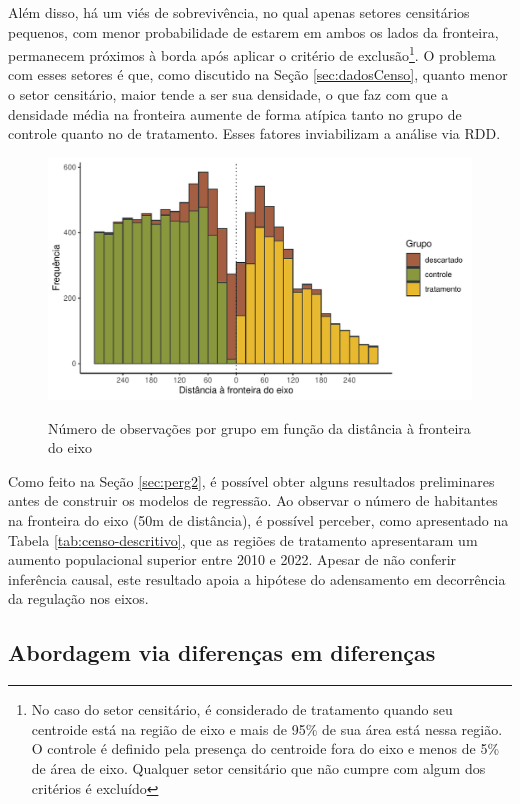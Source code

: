 Além disso, há um viés de sobrevivência, no qual apenas setores censitários pequenos, com menor probabilidade de estarem em ambos os lados da fronteira, permanecem próximos à borda após aplicar o critério de exclusão\footnote{No caso do setor censitário, é considerado de tratamento quando seu centroide está na região de eixo e mais de 95\% de sua área está nessa região. O controle é definido pela presença do centroide fora do eixo e menos de 5\% de área de eixo. Qualquer setor censitário que não cumpre com algum dos critérios é excluído}. O problema com esses setores é que, como discutido na Seção \ref{sec:dadosCenso}, quanto menor o setor censitário, maior tende a ser sua densidade, o que faz com que a densidade média na fronteira aumente de forma atípica tanto no grupo de controle quanto no de tratamento. Esses fatores inviabilizam a análise via RDD.

\begin{figure}[!h]
    \centering
    \caption{Número de observações por grupo em função da distância à fronteira do eixo}
    \includegraphics[width = .75\textwidth]{figuras/rdd-balanceamento-censo.pdf}
    \label{fig:rdd-densidade-censo}
\end{figure}

Como feito na Seção \ref{sec:perg2}, é possível obter alguns resultados preliminares antes de construir os modelos de regressão. Ao observar o número de habitantes na fronteira do eixo (50m de distância), é possível perceber, como apresentado na Tabela \ref{tab:censo-descritivo}, que as regiões de tratamento apresentaram um aumento populacional superior entre 2010 e 2022. Apesar de não conferir inferência causal, este resultado apoia a hipótese do adensamento em decorrência da regulação nos eixos.



\subsection{Abordagem via diferenças em diferenças}

